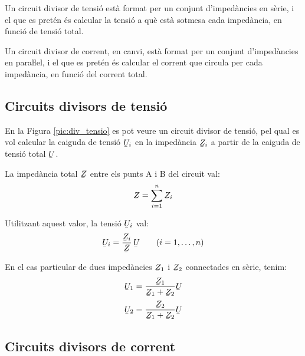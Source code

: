 Un circuit divisor de tensió està format per un conjunt
d'impedàncies en sèrie, i el que es pretén és calcular la
tensió a què està sotmesa cada impedància, en funció de tensió total.

Un circuit divisor de corrent, en canvi, està format per un conjunt
d'impedàncies en paraŀlel, i el que es pretén és calcular el
corrent que circula per cada impedància, en funció del corrent
total.

\subsection{Circuits divisors de tensió}\label{sec:circ-div-tens}

En la Figura \vref{pic:div_tensio} es pot veure un circuit divisor
de tensió, pel qual es vol calcular la caiguda de tensió
$\cmplx{U}_i$ en la impedància $\cmplx{Z}_i$ a partir de la caiguda
de tensió total $\cmplx{U}$.

\begin{center}
\centering
    
    \label{pic:div_tensio}
\end{center}

La impedància total $\cmplx{Z}$ entre els punts A i B del circuit val:
\begin{equation}\label{eq:z_serie}
    \cmplx{Z} = \sum_{i=1}^n \cmplx{Z}_i
\end{equation}

Utilitzant aquest valor, la tensió $\cmplx{U}_i$ val:
\begin{equation}
    \cmplx{U}_i = \frac{\cmplx{Z}_i}{\cmplx{Z}}\,\cmplx{U}\qquad (i=1,\dots,n)\label{eq:div_tensio}
\end{equation}

En el cas particular de dues impedàncies $\cmplx{Z}_1$ i $\cmplx{Z}_2$ connectades en sèrie, tenim:
\begin{subequations}
\begin{align}
    \cmplx{U}_1 &= \frac{\cmplx{Z}_1}{\cmplx{Z}_1+\cmplx{Z}_2} \cmplx{U}  \\[0.5ex]
    \cmplx{U}_2 &= \frac{\cmplx{Z}_2}{\cmplx{Z}_1+\cmplx{Z}_2} \cmplx{U}
\end{align}
\end{subequations}

\subsection{Circuits divisors de corrent}\label{sec:circ-div-corr}

